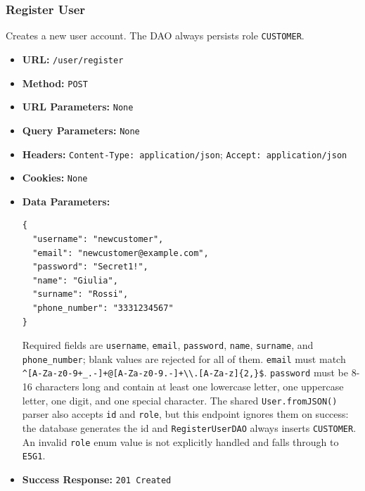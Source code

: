 \subsubsection*{Register User}

Creates a new user account. The DAO always persists role \texttt{CUSTOMER}.

\begin{itemize}[nosep]
\item \textbf{URL:} \texttt{/user/register}

\item \textbf{Method:} \texttt{POST}

\item \textbf{URL Parameters:} \texttt{None}

\item \textbf{Query Parameters:} \texttt{None}

\item \textbf{Headers:} \texttt{Content-Type: application/json}; \texttt{Accept: application/json}

\item \textbf{Cookies:} \texttt{None}

\item \textbf{Data Parameters:}

\begin{lstlisting}
{
  "username": "newcustomer",
  "email": "newcustomer@example.com",
  "password": "Secret1!",
  "name": "Giulia",
  "surname": "Rossi",
  "phone_number": "3331234567"
}
\end{lstlisting}

Required fields are \texttt{username}, \texttt{email}, \texttt{password}, \texttt{name}, \texttt{surname}, and \texttt{phone\_number}; blank values are rejected for all of them. \texttt{email} must match \texttt{\textasciicircum{}[A-Za-z0-9+\_.-]+@[A-Za-z0-9.-]+\textbackslash{}\textbackslash{}.[A-Za-z]\{2,\}\$}. \texttt{password} must be 8-16 characters long and contain at least one lowercase letter, one uppercase letter, one digit, and one special character. The shared \texttt{User.fromJSON()} parser also accepts \texttt{id} and \texttt{role}, but this endpoint ignores them on success: the database generates the id and \texttt{RegisterUserDAO} always inserts \texttt{CUSTOMER}. An invalid \texttt{role} enum value is not explicitly handled and falls through to \texttt{E5G1}.

\item \textbf{Success Response:} \texttt{201 Created}


\end{itemize}
